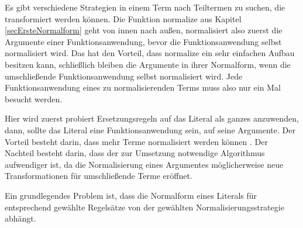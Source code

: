 Es gibt verschiedene Strategien in einem Term nach Teiltermen zu suchen, die transformiert werden können. Die Funktion $\mathrm{normalize}$ aus Kapitel \ref{secErsteNormalform} geht von innen nach außen, normalisiert also zuerst die Argumente einer Funktionsanwendung, bevor die Funktionsanwendung selbst normalisiert wird. Das hat den Vorteil, dass $\mathrm{normalize}$ ein sehr einfachen Aufbau besitzen kann, schließlich bleiben die Argumente in ihrer Normalform, wenn die umschließende Funktionsanwendung selbst normalisiert wird. Jede Funktionsanwendung eines zu normalisierenden Terms muss also nur ein Mal besucht werden.


Hier wird zuerst probiert Ersetzungsregeln auf das Literal als ganzes anzuwenden, dann, sollte das Literal eine Funktionsanwendung sein, auf seine Argumente. Der Vorteil besteht darin, dass mehr Terme normalisiert werden können \cite{EvalStrategien}. Der Nachteil besteht darin, dass der zur Umsetzung notwendige Algorithmus aufwendiger ist, da die Normalisierung eines Argumentes möglicherweise neue Transformationen für umschließende Terme eröffnet.

Ein grundlegendes Problem ist, dass die Normalform eines Literals für entsprechend gewählte Regelsätze von der gewählten Normalisierungsstrategie abhängt. 


















